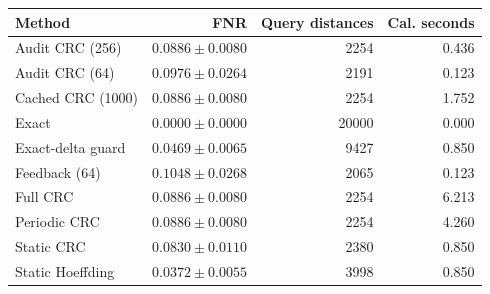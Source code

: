 \begin{tabular}{lrrr}
\hline
Method & FNR & Query distances & Cal. seconds \\
\hline
Audit CRC (256) & $0.0886 \pm 0.0080$ & 2254 & 0.436 \\
Audit CRC (64) & $0.0976 \pm 0.0264$ & 2191 & 0.123 \\
Cached CRC (1000) & $0.0886 \pm 0.0080$ & 2254 & 1.752 \\
Exact & $0.0000 \pm 0.0000$ & 20000 & 0.000 \\
Exact-delta guard & $0.0469 \pm 0.0065$ & 9427 & 0.850 \\
Feedback (64) & $0.1048 \pm 0.0268$ & 2065 & 0.123 \\
Full CRC & $0.0886 \pm 0.0080$ & 2254 & 6.213 \\
Periodic CRC & $0.0886 \pm 0.0080$ & 2254 & 4.260 \\
Static CRC & $0.0830 \pm 0.0110$ & 2380 & 0.850 \\
Static Hoeffding & $0.0372 \pm 0.0055$ & 3998 & 0.850 \\
\hline
\end{tabular}
